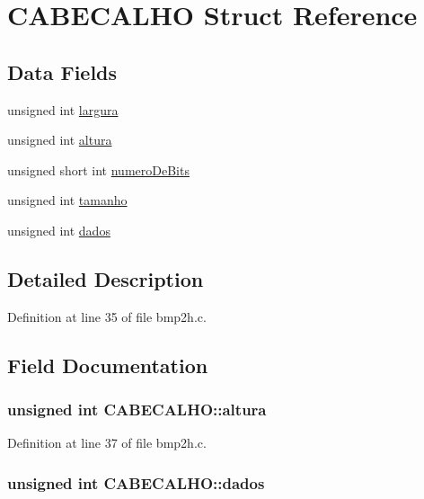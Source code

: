 \hypertarget{structCABECALHO}{
\section{CABECALHO Struct Reference}
\label{structCABECALHO}
}
\subsection*{Data Fields}
\begin{DoxyCompactItemize}
\item 
unsigned int \hyperlink{structCABECALHO_ada5c33aa4b5ea8b94f7f632e0d09a8d0}{largura}
\item 
unsigned int \hyperlink{structCABECALHO_a60a47c4f019d845d60fb07e6e176bb70}{altura}
\item 
unsigned short int \hyperlink{structCABECALHO_aa02a718fcfd20a244bd95a8c0d025c72}{numeroDeBits}
\item 
unsigned int \hyperlink{structCABECALHO_a47b5e21a4f3f6e7c57bdcb170179d154}{tamanho}
\item 
unsigned int \hyperlink{structCABECALHO_aa22469bf559b75ea2494ffc271fb5b14}{dados}
\end{DoxyCompactItemize}


\subsection{Detailed Description}


Definition at line 35 of file bmp2h.c.



\subsection{Field Documentation}
\hypertarget{structCABECALHO_a60a47c4f019d845d60fb07e6e176bb70}{
\subsubsection[{altura}]{\setlength{\rightskip}{0pt plus 5cm}unsigned int {\bf CABECALHO::altura}}}
\label{structCABECALHO_a60a47c4f019d845d60fb07e6e176bb70}


Definition at line 37 of file bmp2h.c.

\hypertarget{structCABECALHO_aa22469bf559b75ea2494ffc271fb5b14}{
\subsubsection[{dados}]{\setlength{\rightskip}{0pt plus 5cm}unsigned int {\bf CABECALHO::dados}}}
\label{structCABECALHO_aa22469bf559b75ea2494ffc271fb5b14}


